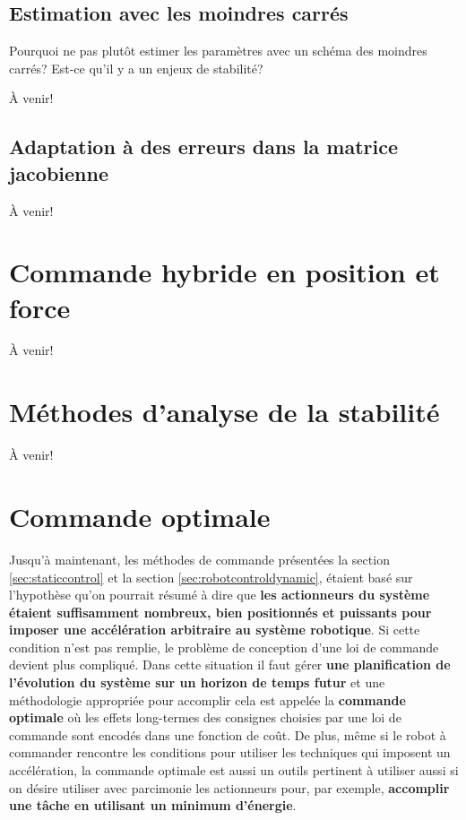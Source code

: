 \subsection{Estimation avec les moindres carrés}

Pourquoi ne pas plutôt estimer les paramètres avec un schéma des moindres carrés? Est-ce qu'il y a un enjeux de stabilité?

À venir!


\subsection{Adaptation à des erreurs dans la matrice jacobienne}

À venir!



\newpage
\section{Commande hybride en position et force}

À venir!


\newpage
\section{Méthodes d'analyse de la stabilité}




À venir!


\newpage
\section{Commande optimale}

Jusqu'à maintenant, les méthodes de commande présentées la section \ref{sec:staticcontrol} et la section \ref{sec:robotcontroldynamic},  étaient basé sur l'hypothèse qu'on pourrait résumé à dire que \textbf{les actionneurs du système étaient suffisamment nombreux, bien positionnés et puissants pour imposer une accélération arbitraire au système robotique}. Si cette condition n'est pas remplie, le problème de conception d'une loi de commande devient plus compliqué. Dans cette situation il faut gérer \textbf{une planification de l'évolution du système sur un horizon de temps futur} et une méthodologie appropriée pour accomplir cela est appelée la \textbf{commande optimale} où les effets long-termes des consignes choisies par une loi de commande sont encodés dans une fonction de coût. De plus, même si le robot à commander rencontre les conditions pour utiliser les techniques qui imposent un accélération, la commande optimale est aussi un outils pertinent à utiliser aussi si on désire utiliser avec parcimonie les actionneurs pour, par exemple, \textbf{accomplir une tâche en utilisant un minimum d'énergie}.

